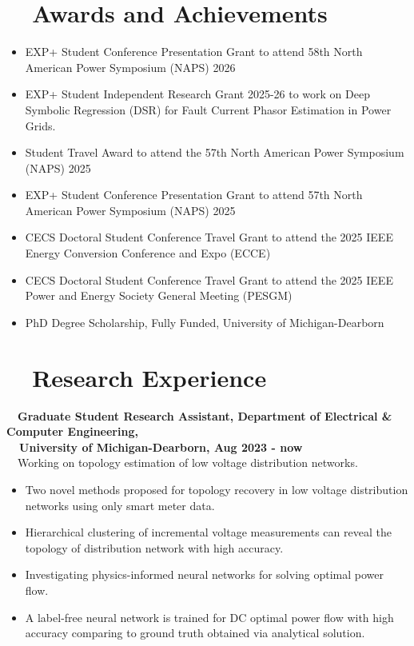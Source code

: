 \documentclass[a4paper,8pt]{article}
\begin{document}
\section{~~Awards and Achievements}
\begin{itemize}
    \item EXP+ Student Conference Presentation Grant to attend 58th North American Power Symposium (NAPS) 2026
    \item EXP+ Student Independent Research Grant 2025-26 to work on Deep Symbolic Regression (DSR) for Fault Current Phasor Estimation in Power Grids.
    \item Student Travel Award to attend the 57th North American Power Symposium (NAPS) 2025
    \item EXP+ Student Conference Presentation Grant to attend 57th North American Power Symposium (NAPS) 2025
    \item  CECS Doctoral Student Conference Travel Grant to attend the 2025 IEEE Energy Conversion Conference and Expo (ECCE)
    \item  CECS Doctoral Student Conference Travel Grant to attend the 2025 IEEE Power and Energy Society General Meeting (PESGM)
    \item PhD Degree Scholarship, Fully Funded, University of Michigan-Dearborn
\end{itemize}

\section{~~Research Experience}

~~\textbf{Graduate Student Research Assistant, Department of Electrical \& Computer Engineering,\\
~~University of Michigan-Dearborn, Aug 2023 - now}\\
~~Working on topology estimation of low voltage distribution networks.
\begin{itemize}
    \item Two novel methods proposed for topology recovery in low voltage distribution networks using only smart meter data.  
    \item Hierarchical clustering of incremental voltage measurements can reveal the topology of distribution network with high accuracy.
    \item Investigating physics-informed neural networks for solving optimal power flow.   
    \item A label-free neural network is trained for DC optimal power flow with high accuracy comparing to ground truth obtained via analytical solution.
\end{itemize}
\end{document}
